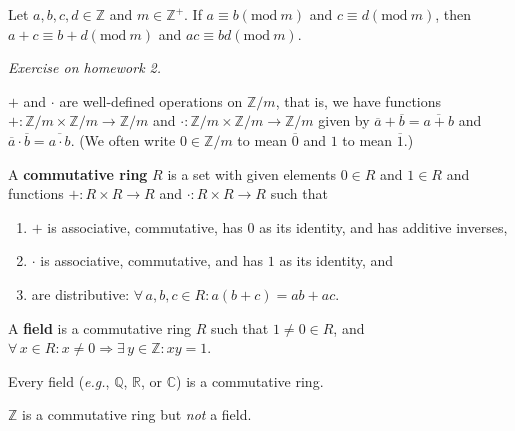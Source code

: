 \documentclass{notes}
\begin{document}
\begin{prop}
  Let $a, b, c, d \in \mathbb Z$ and $m \in \mathbb Z^+$.
  If $a \equiv b (\mathrm{mod}\ m)$ and $c \equiv d (\mathrm{mod}\ m)$, then $a + c \equiv b + d (\mathrm{mod}\ m)$ and $a c \equiv b d (\mathrm{mod}\ m)$.
\end{prop}

\begin{prf}
  \textit{Exercise on homework 2.}
\end{prf}

\begin{cor}
  $+$ and $\cdot$ are well-defined operations on $\mathbb Z / m$, that is, we have functions $+ \colon \mathbb Z / m \times \mathbb Z / m \to \mathbb Z / m$ and $\cdot \colon \mathbb Z / m \times \mathbb Z / m \to \mathbb Z / m$ given by $\overline a + \overline b = \overline{a + b}$ and $\overline a \cdot \overline b = \overline{a \cdot b}$.
  (We often write $0 \in \mathbb Z / m$ to mean $\overline 0$ and $1$ to mean $\overline 1$.)
\end{cor}

\begin{defn}
  A {\boldmath \bfseries commutative ring} $R$ is a set with given elements $0 \in R$ and $1 \in R$ and functions $+ \colon R \times R \to R$ and $\cdot \colon R \times R \to R$ such that 
  \begin{enumerate}
    \item $+$ is associative, commutative, has $0$ as its identity, and has additive inverses, 

    \item $\cdot$ is associative, commutative, and has $1$ as its identity, and 

    \item are distributive: $\forall \, a, b, c \in R: a (b + c) = a b + a c$.
  \end{enumerate}
\end{defn}

\begin{rmk}
  A {\boldmath \bfseries field} is a commutative ring $R$ such that $1 \neq 0 \in R$, and $\forall \, x \in R: x \neq 0 \Rightarrow \exists \, y \in \mathbb Z: x y = 1$.
\end{rmk}

\begin{eg}
  Every field (\textit{e.g.}, $\mathbb Q$, $\mathbb R$, or $\mathbb C$) is a commutative ring.
\end{eg}

\begin{eg}
  $\mathbb Z$ is a commutative ring but \textit{not} a field.
\end{eg}
\end{document}
